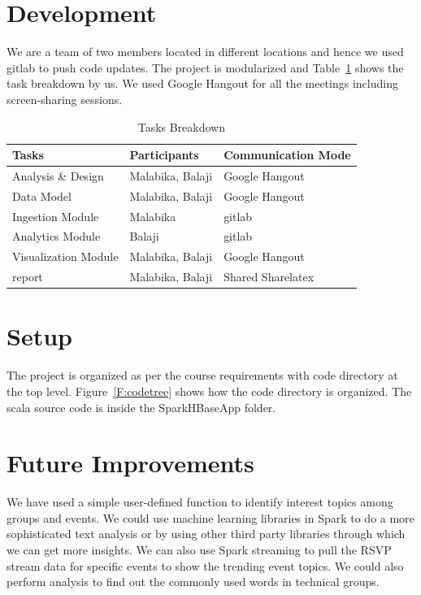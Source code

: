 \documentclass{acm_proc_article-sp}
\begin{document}
\section{Development}
We are a team of two members located in different locations and hence we used gitlab to push code updates.  The project is modularized and Table~\ref{T:tasks} shows the task breakdown by us.  We used Google Hangout for all the meetings including screen-sharing sessions.
\begin{table}[htb]
\caption{Tasks Breakdown}\label{T:tasks}
\bigskip
\begin{center}
\begin{tabular}{|p{3cm}|p{2cm}|p{3cm}|} \hline 
Tasks & Participants & Communication Mode\\ \hline
Analysis \& Design & Malabika, Balaji & Google Hangout\\ \hline
Data Model & Malabika, Balaji & Google Hangout\\ \hline
Ingestion Module & Malabika & gitlab\\ \hline
Analytics Module & Balaji & gitlab\\ \hline
Visualization Module & Malabika, Balaji & Google Hangout\\ \hline
report & Malabika, Balaji & Shared Sharelatex\\ 
\hline\end{tabular}
\end{center}
\end{table}

\section{Setup}
The project is organized as per the course requirements with code directory at the top level.  Figure~\ref{F:codetree} shows how the code directory is organized.  The scala source code is inside the SparkHBaseApp folder.

\section{Future Improvements}
We have used a simple user-defined function to identify interest topics among groups and events.  We could use machine learning libraries in Spark to do a more sophisticated text analysis or by using other third party libraries through which we can get more insights.  We can also use Spark streaming to pull the RSVP stream data for specific events to show the trending event topics.  We could also perform analysis to find out the commonly used words in technical groups.





\end{document}

